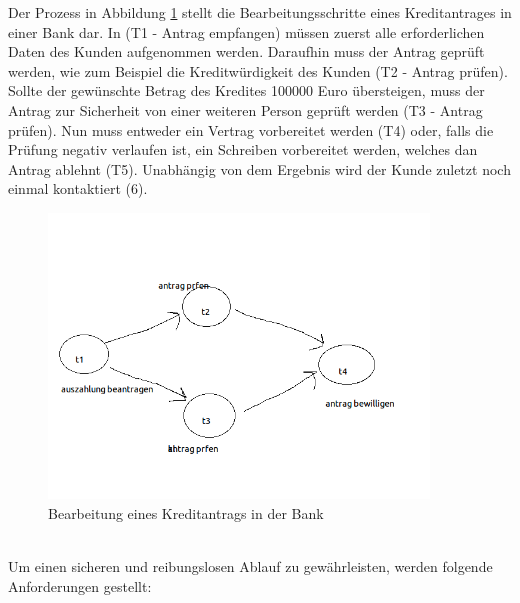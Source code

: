 Der Prozess in Abbildung \ref{fig:Workflow} stellt die Bearbeitungsschritte eines Kreditantrages in einer Bank dar. In (T1 - Antrag empfangen) müssen zuerst alle erforderlichen Daten des Kunden aufgenommen werden. Daraufhin muss der Antrag geprüft werden, wie zum Beispiel die Kreditwürdigkeit des Kunden (T2 - Antrag prüfen). Sollte der gewünschte Betrag des Kredites 100000 Euro übersteigen, muss der Antrag zur Sicherheit von einer weiteren Person geprüft werden (T3 - Antrag prüfen). Nun muss entweder ein Vertrag vorbereitet werden (T4) oder, falls die Prüfung negativ verlaufen ist, ein Schreiben vorbereitet werden, welches dan Antrag ablehnt (T5). Unabhängig von dem Ergebnis wird der Kunde zuletzt noch einmal kontaktiert (6).
\begin{figure}[ht]
	\centering
  \includegraphics[width=0.9\textwidth]{Figures/Workflow}
	\caption{Bearbeitung eines Kreditantrags in der Bank}
	\label{fig:Workflow}
\end{figure}
\\
Um einen sicheren und reibungslosen Ablauf zu gewährleisten, werden folgende Anforderungen gestellt:

